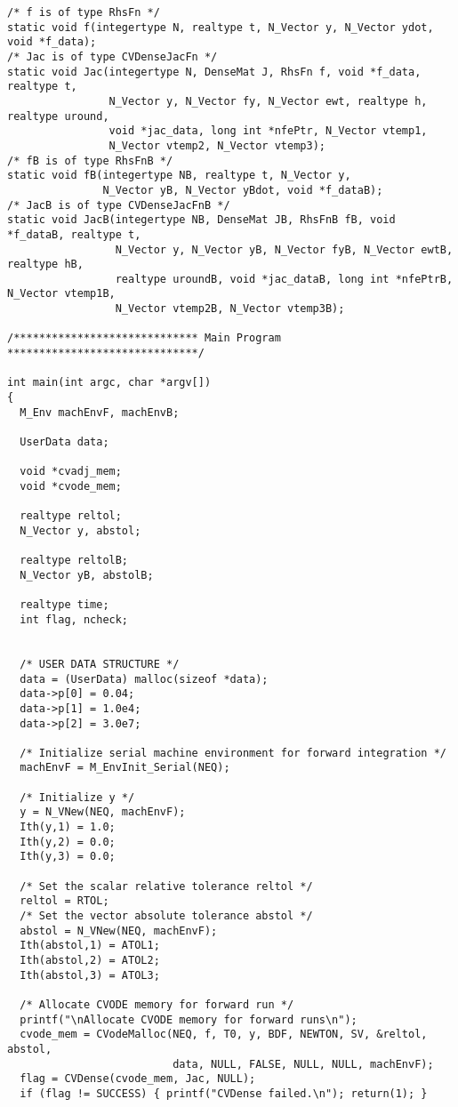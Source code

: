 \begin{verbatim}
/* f is of type RhsFn */
static void f(integertype N, realtype t, N_Vector y, N_Vector ydot, void *f_data);
/* Jac is of type CVDenseJacFn */
static void Jac(integertype N, DenseMat J, RhsFn f, void *f_data, realtype t,
                N_Vector y, N_Vector fy, N_Vector ewt, realtype h, realtype uround,
                void *jac_data, long int *nfePtr, N_Vector vtemp1,
                N_Vector vtemp2, N_Vector vtemp3);
/* fB is of type RhsFnB */
static void fB(integertype NB, realtype t, N_Vector y, 
               N_Vector yB, N_Vector yBdot, void *f_dataB);
/* JacB is of type CVDenseJacFnB */
static void JacB(integertype NB, DenseMat JB, RhsFnB fB, void *f_dataB, realtype t,
                 N_Vector y, N_Vector yB, N_Vector fyB, N_Vector ewtB, realtype hB, 
                 realtype uroundB, void *jac_dataB, long int *nfePtrB, N_Vector vtemp1B,
                 N_Vector vtemp2B, N_Vector vtemp3B);

/***************************** Main Program ******************************/

int main(int argc, char *argv[])
{
  M_Env machEnvF, machEnvB;

  UserData data;

  void *cvadj_mem;
  void *cvode_mem;

  realtype reltol;
  N_Vector y, abstol;

  realtype reltolB;
  N_Vector yB, abstolB;

  realtype time;
  int flag, ncheck;


  /* USER DATA STRUCTURE */
  data = (UserData) malloc(sizeof *data);
  data->p[0] = 0.04;
  data->p[1] = 1.0e4;
  data->p[2] = 3.0e7;

  /* Initialize serial machine environment for forward integration */
  machEnvF = M_EnvInit_Serial(NEQ);

  /* Initialize y */
  y = N_VNew(NEQ, machEnvF); 
  Ith(y,1) = 1.0;                
  Ith(y,2) = 0.0;
  Ith(y,3) = 0.0;

  /* Set the scalar relative tolerance reltol */
  reltol = RTOL;               
  /* Set the vector absolute tolerance abstol */
  abstol = N_VNew(NEQ, machEnvF); 
  Ith(abstol,1) = ATOL1;       
  Ith(abstol,2) = ATOL2;
  Ith(abstol,3) = ATOL3;

  /* Allocate CVODE memory for forward run */
  printf("\nAllocate CVODE memory for forward runs\n");
  cvode_mem = CVodeMalloc(NEQ, f, T0, y, BDF, NEWTON, SV, &reltol, abstol,
                          data, NULL, FALSE, NULL, NULL, machEnvF);
  flag = CVDense(cvode_mem, Jac, NULL);
  if (flag != SUCCESS) { printf("CVDense failed.\n"); return(1); }


\end{verbatim}
